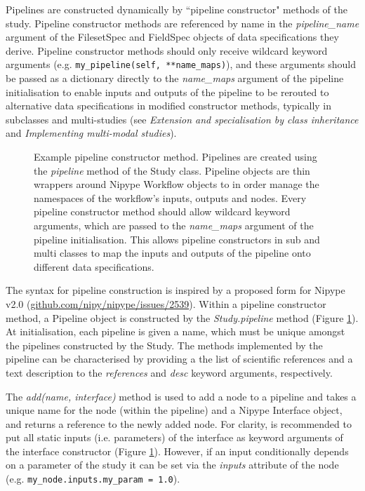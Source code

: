 \documentclass[smallextended]{svjour3}       %
\begin{document}
Pipelines are constructed dynamically by ``pipeline constructor" methods
of the study. Pipeline constructor methods are referenced by name in the \emph{pipeline\_name}
argument of the FilesetSpec and FieldSpec objects of data specifications
they derive. Pipeline constructor methods should only receive wildcard keyword
arguments (e.g. \lstinline{my_pipeline(self, **name_maps)}), and these arguments
should be passed as a dictionary directly to the \emph{name\_maps} argument
of the pipeline initialisation to enable inputs and outputs of the
pipeline to be rerouted to alternative data specifications in modified constructor
methods, typically in subclasses and multi-studies (see
\emph{Extension and specialisation by class inheritance} and \emph{Implementing multi-modal studies}).

\begin{figure}

\caption{Example pipeline constructor method. Pipelines are
created using the \emph{pipeline} method of the Study class.
Pipeline objects are thin wrappers around Nipype Workflow objects to
in order manage the namespaces of the workflow's inputs, outputs and nodes. Every
pipeline constructor method should allow wildcard keyword arguments,
which are passed to the \emph{name\_maps} argument of the pipeline
initialisation. This allows pipeline constructors in sub and multi classes to map the
inputs and outputs of the pipeline onto different data specifications.}
\label{fig:pipeline_constructor}
\end{figure}

The syntax for pipeline construction is inspired by a proposed form for Nipype v2.0
(\url{github.com/nipy/nipype/issues/2539}).
Within a pipeline constructor method, a Pipeline object is constructed by the \emph{Study.pipeline} method
(Figure \ref{fig:pipeline_constructor}). At initialisation, each pipeline is given a name,
which must be unique amongst the pipelines constructed by the Study. The methods implemented
by the pipeline can be characterised by providing a the list of scientific references
and a text description to the \emph{references} and \emph{desc} keyword arguments, respectively.

The \emph{add(name, interface)} method is used to add a node to a pipeline and takes
a unique name for the node (within the pipeline) and a Nipype Interface object, and returns
a reference to the newly added node. For clarity, is recommended to put all static inputs
(i.e. parameters) of the interface as keyword arguments of the interface constructor
(Figure \ref{fig:pipeline_constructor}). However, if an input conditionally depends on a parameter of the
study it can be set via the \emph{inputs} attribute of the node (e.g. \lstinline{my_node.inputs.my_param = 1.0}).
\end{document}
